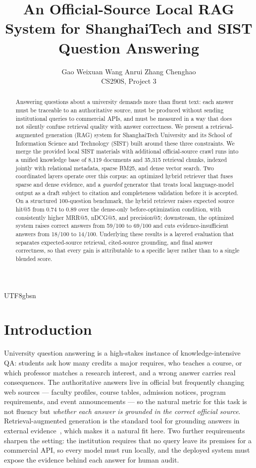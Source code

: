 \documentclass{article}
\title{An Official-Source Local RAG System for ShanghaiTech and SIST Question Answering}
\author{%
  Gao Weixuan \quad Wang Anrui \quad Zhang Chenghao \\
  CS290S, Project 3 \\
}
\begin{document}
\begin{CJK*}{UTF8}{gbsn}

\maketitle

\begin{abstract}
Answering questions about a university demands more than fluent text: each answer must be traceable to an authoritative source, must be produced without sending institutional queries to commercial APIs, and must be measured in a way that does not silently confuse retrieval quality with answer correctness. We present a retrieval-augmented generation (RAG) system for ShanghaiTech University and its School of Information Science and Technology (SIST) built around these three constraints. We merge the provided local SIST materials with additional official-source crawl runs into a unified knowledge base of 8{,}119 documents and 35{,}315 retrieval chunks, indexed jointly with relational metadata, sparse BM25, and dense vector search. Two coordinated layers operate over this corpus: an optimized hybrid retriever that fuses sparse and dense evidence, and a \emph{guarded} generator that treats local language-model output as a draft subject to citation and completeness validation before it is accepted. On a structured 100-question benchmark, the hybrid retriever raises expected source hit@5 from 0.74 to 0.89 over the dense-only before-optimization condition, with consistently higher MRR@5, nDCG@5, and precision@5; downstream, the optimized system raises correct answers from 59/100 to 69/100 and cuts evidence-insufficient answers from 18/100 to 14/100. Underlying these results is a layered evaluation that separates expected-source retrieval, cited-source grounding, and final answer correctness, so that every gain is attributable to a specific layer rather than to a single blended score.
\end{abstract}

\section{Introduction}

University question answering is a high-stakes instance of knowledge-intensive QA: students ask how many credits a major requires, who teaches a course, or which professor matches a research interest, and a wrong answer carries real consequences. The authoritative answers live in official but frequently changing web sources --- faculty profiles, course tables, admission notices, program requirements, and event announcements --- so the natural metric for this task is not fluency but \emph{whether each answer is grounded in the correct official source}. Retrieval-augmented generation is the standard tool for grounding answers in external evidence~\cite{lewis2020rag, gao2023rag}, which makes it a natural fit here. Two further requirements sharpen the setting: the institution requires that no query leave its premises for a commercial API, so every model must run locally, and the deployed system must expose the evidence behind each answer for human audit.


\end{CJK*}
\end{document}
